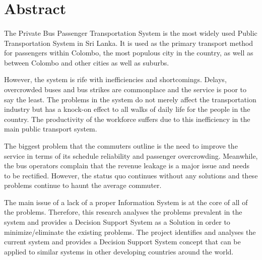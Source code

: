 \clearpage
\section*{Abstract}

\paragraph{ } The Private Bus Passenger Transportation System is the most widely used Public Transportation System in Sri Lanka. It is used as the primary transport method for passengers within Colombo, the most populous city in the country, as well as between Colombo and other cities as well as suburbs.

However, the system is rife with inefficiencies and shortcomings. Delays, overcrowded buses and bus strikes are commonplace and the service is poor to say the least. The problems in the system do not merely affect the transportation industry but has a knock-on effect to all walks of daily life for the people in the country. The productivity of the workforce suffers due to this inefficiency in the main public transport system.

The biggest problem that the commuters outline is the need to improve the service in terms of its schedule reliability and passenger overcrowding. Meanwhile, the bus operators complain that the revenue leakage is a major issue and needs to be rectified. However, the status quo continues without any solutions and these problems continue to haunt the average commuter.

The main issue of a lack of a proper Information System is at the core of all of the problems. Therefore, this research analyses the problems prevalent in the system and provides a Decision Support System as a Solution in order to minimize/eliminate the existing problems. The project identifies and analyses the current system and provides a Decision Support System concept that can be applied to similar systems in other developing countries around the world.